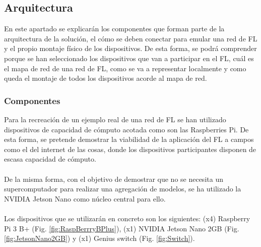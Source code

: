 \subsection{Arquitectura}
En este apartado se explicarán los componentes que forman parte de la arquitectura de la solución, el cómo se deben conectar para emular una red de FL y el propio montaje físico de los dispositivos. De esta forma, se podrá comprender porque se han seleccionado los dispositivos que van a participar en el FL, cuál es el mapa de red de una red de FL, como se va a representar localmente y como queda el montaje de todos los dispositivos acorde al mapa de red.  

\subsubsection{Componentes}
Para la recreación de un ejemplo real de una red de FL se han utilizado dispositivos de capacidad de cómputo acotada como son las Raspberries Pi. De esta forma, se pretende demostrar la viabilidad de la aplicación del FL a campos como el del internet de las cosas, donde los dispositivos participantes disponen de escasa capacidad de cómputo.
\\ \\
De la misma forma, con el objetivo de demostrar que no se necesita un supercomputador para realizar una agregación de modelos, se ha utilizado la NVIDIA Jetson Nano como núcleo central para ello.
\\ \\
Los dispositivos que se utilizarán en concreto son los siguientes: (x4) Raspberry Pi 3 B+ (Fig. \ref{fig:RaspBerrryBPlus}), (x1) NVIDIA Jetson Nano 2GB (Fig. \ref{fig:JetsonNano2GB}) y (x1) Genius switch (Fig. \ref{fig:Switch}).

